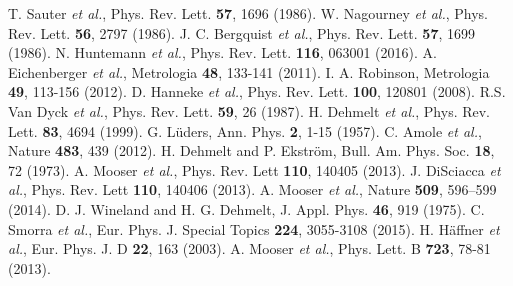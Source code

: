 \documentclass[12pt,preprint%
]{elsarticle}
\begin{document}
\begin{thebibliography}{}

 T. Sauter \textit{et al.}, Phys. Rev. Lett. \textbf{57}, 1696 (1986).
 W. Nagourney \textit{et al.}, Phys. Rev. Lett. \textbf{56}, 2797 (1986).
 J. C. Bergquist \textit{et al.}, Phys. Rev. Lett. \textbf{57}, 1699 (1986).
 N. Huntemann \textit{et al.}, Phys. Rev. Lett. \textbf{116}, 063001 (2016).
 A. Eichenberger \textit{et al.}, Metrologia \textbf{48}, 133-141 (2011).
 I. A. Robinson, Metrologia \textbf{49}, 113-156 (2012).
 D. Hanneke \textit{et al.}, Phys. Rev. Lett. \textbf{100}, 120801 (2008).
 R.S. Van Dyck \textit{et al.}, Phys. Rev. Lett. \textbf{59}, 26 (1987).
 H. Dehmelt \textit{et al.}, Phys. Rev. Lett. \textbf{83}, 4694 (1999).
 G. L\"uders, Ann. Phys. \textbf{2}, 1-15 (1957).
 C. Amole \textit{et al.}, Nature \textbf{483}, 439 (2012).
 H. Dehmelt and P. Ekstr\"om, Bull. Am. Phys. Soc. \textbf{18}, 72 (1973).
 A. Mooser \textit{et al.}, Phys. Rev. Lett \textbf{110}, 140405 (2013).
 J. DiSciacca \textit{et al.}, Phys. Rev. Lett \textbf{110}, 140406 (2013).
 A. Mooser \textit{et al.}, Nature \textbf{509}, 596–599 (2014).
 D. J. Wineland and H. G. Dehmelt, J. Appl. Phys. \textbf{46}, 919 (1975).
 C. Smorra \textit{et al.}, Eur. Phys. J. Special Topics \textbf{224}, 3055-3108 (2015).
 H. H\"affner \textit{et al.}, Eur. Phys. J. D \textbf{22}, 163 (2003).
 A. Mooser \textit{et al.}, Phys. Lett. B \textbf{723}, 78-81 (2013).


\end{thebibliography}
\end{document}
